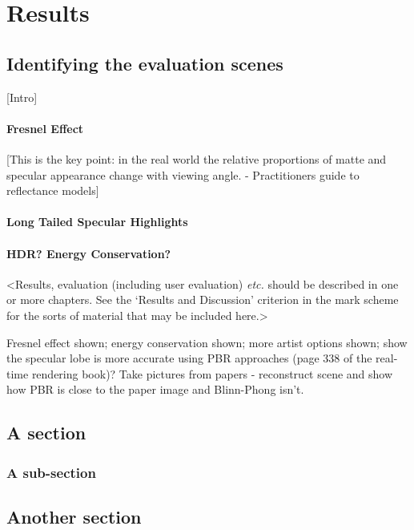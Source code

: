 \chapter{Results}
\label{chapter3}

\section{Identifying the evaluation scenes}

[Intro]

\subsubsection{Fresnel Effect}

[This is the key point: in the real world the relative proportions of matte and specular appearance change with viewing
angle. - Practitioners guide to reflectance models]

\subsubsection{Long Tailed Specular Highlights}

\subsubsection{HDR? Energy Conservation?}

<Results, evaluation (including user evaluation) {\em etc.} should be described in one or more chapters. See the `Results and Discussion' criterion in the mark scheme for the sorts of material that may be included here.>

Fresnel effect shown; energy conservation shown; more artist options shown; show the specular lobe is more accurate using PBR approaches (page 338 of the real-time rendering book)? Take pictures from papers - reconstruct scene and show how PBR is close to the paper image and Blinn-Phong isn't.

\section{A section}
\lipsum[8]

\subsection{A sub-section}
\lipsum[11]

\section{Another section}
\lipsum[12]
